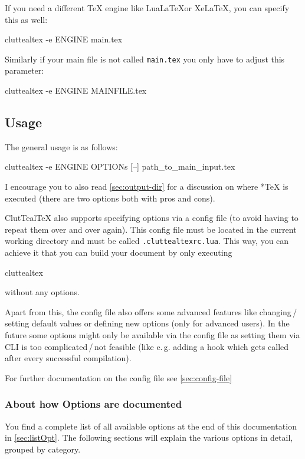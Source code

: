 \documentclass[a4paper, 11pt]{scrartcl}
\newcommand\eg{e.\,g.\xspace}
\let\TeXold\TeX
\newcommand\CluttealTeX{ClutTeal\TeX\xspace}
\renewcommand\TeX{\TeXold\xspace}
\begin{document}
If you need a different \TeX engine like Lua\LaTeX or Xe\LaTeX, you can specify this as well:
\begin{boxcmd}
  cluttealtex -e ENGINE main.tex
\end{boxcmd}

Similarly if your main file is not called \texttt{main.tex} you only have to adjust this parameter:
\begin{boxcmd}
  cluttealtex -e ENGINE MAINFILE.tex
\end{boxcmd}

\subsection{Usage}
The general usage is as follows:
\begin{boxcmd}
  cluttealtex -e ENGINE OPTIONs [--] path\_to\_main\_input.tex
\end{boxcmd}

I encourage you to also read \cref{sec:output-dir} for a discussion on where *\TeX is executed (there are two options both with pros and cons).

\CluttealTeX also supports specifying options via a config file (to avoid having to repeat them over and over again).
This config file must be located in the current working directory and must be called \texttt{.cluttealtexrc.lua}.
This way, you can achieve it that you can build your document by only executing
\begin{boxcmd}
	cluttealtex
\end{boxcmd}
without any options.

Apart from this, the config file also offers some advanced features like changing\,/\,setting default values or defining new options (only for advanced users).
In the future some options might only be available via the config file as setting them via CLI is too complicated\,/\,not feasible (like \eg adding a hook which gets called after every successful compilation).

For further documentation on the config file see \cref{sec:config-file}

\subsubsection{About how Options are documented} \label{sec:opt-doc}

You find a complete list of all available options at the end of this documentation in \cref{sec:listOpt}.
The following sections will explain the various options in detail, grouped by category.
\end{document}
